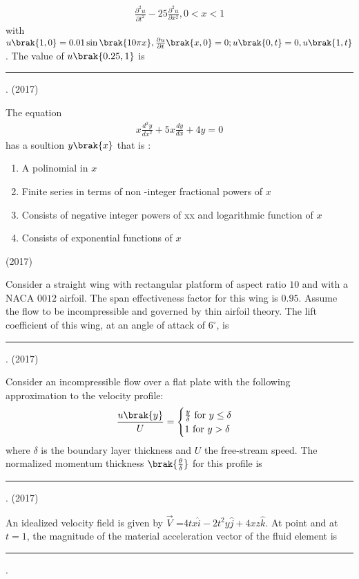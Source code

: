        \begin{align*}
           \frac{\partial^2u}{\partial t^2}-25\frac{\partial^2u}{\partial x^2}, 0<x<1
       \end{align*}
       with $u\brak{1,0}=0.01\sin \brak{10\pi x}, \frac{\partial u}{\partial t}\brak{x,0}=0; u\brak{0,t}=0, u\brak{1,t}$. The value of $u\brak{0.25,1}$ is \rule{1cm}{0.15mm} .
       \hfill{(2017)}
	\item  The equation \begin{align*}
	    x\frac{d^2y}{dx^2}+5x\frac{dy}{dx}+4y=0
	\end{align*}
        has a soultion $y\brak{x}$ that is :
		\begin{enumerate}
			\item A polinomial in $x$
			\item Finite series in terms of non -integer fractional powers of $x$
			\item Consists of negative integer powers of xx and logarithmic function of $x$
	        \item Consists of exponential functions of $x$
        	\end{enumerate}
        	\hfill{(2017)}
	\item Consider a straight wing with rectangular platform of aspect ratio $10$ and with a NACA $0012$ airfoil. The span effectiveness factor for this wing is $0.95$. Assume the flow to be incompressible and governed by thin airfoil theory. The lift coefficient of this wing, at an angle of attack of $6^\circ$, is \rule{1cm}{0.15mm} .
	\hfill{(2017)}
	\item Consider an incompressible flow over a flat plate with the following approximation to the velocity profile:
 \begin{align*}
     \frac{u\brak{y}}{U}=\begin{cases}
         \frac{y}{\delta} \text{ for } y\leq \delta \\
1 \text{ for } y> \delta
     \end{cases}
 \end{align*}
 where $\delta$ is the boundary layer thickness and $U$ the free-stream speed. The normalized momentum thickness $\brak{\frac{\theta}{\delta}}$ for this profile is \rule{1cm}{0.15mm} .
 \hfill{(2017)}
	\item An idealized velocity field is given by $\Vec{V}$ =$4tx\hat{i}-2t^2y\hat{j}+4xz\hat{k}$. At point  and at $t=1$, the magnitude of the material acceleration vector of the fluid element is \rule{1cm}{0.15mm}.
